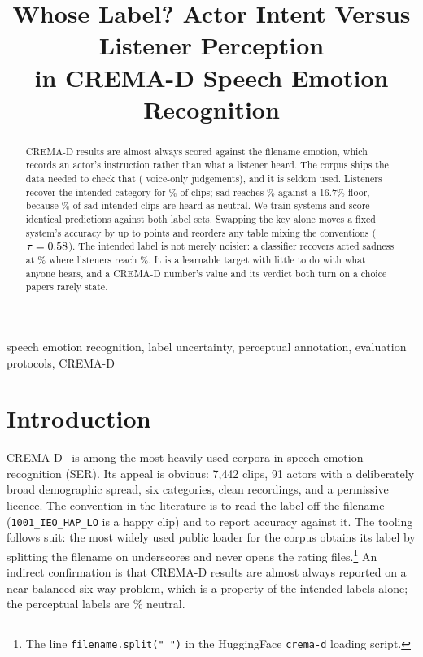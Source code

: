 \documentclass{article}
\title{Whose Label? Actor Intent Versus Listener Perception \\
  in CREMA-D Speech Emotion Recognition}
\begin{document}
\ninept
\maketitle

\begin{abstract}
CREMA-D results are almost always scored against the filename emotion, which
records an actor's instruction rather than what a listener heard. The corpus
ships the data needed to check that (\NRatings{} voice-only judgements), and it
is seldom used. Listeners recover the intended category for \Recovery\% of
clips; sad reaches \SadRecovery\% against a 16.7\% floor, because
\SadToNeutral\% of sad-intended clips are heard as neutral. We train
\NSystemsWord{} systems and score identical predictions against both label sets.
Swapping the key alone moves a fixed system's accuracy by up to \SwingWAmax{}
points and reorders any table mixing the conventions ($\tau = 0.58$). The
intended label is not merely noisier: a classifier recovers acted sadness at
\ModelSad\% where listeners reach \HumanSad\%. It is a learnable target with
little to do with what anyone hears, and a CREMA-D number's value and its
verdict both turn on a choice papers rarely state.
\end{abstract}

\begin{keywords}
speech emotion recognition, label uncertainty, perceptual annotation,
evaluation protocols, CREMA-D
\end{keywords}

\section{Introduction}
\label{sec:intro}

CREMA-D~\cite{cao2014cremad} is among the most heavily used corpora in speech
emotion recognition (SER). Its appeal is obvious: 7{,}442 clips, 91 actors with
a deliberately broad demographic spread, six categories, clean recordings, and a
permissive licence. The convention in the literature is to read the label off
the filename (\texttt{1001\_IEO\_HAP\_LO} is a happy clip) and to report
accuracy against it. The tooling follows suit: the most widely used public
loader for the corpus obtains its label by splitting the filename on underscores
and never opens the rating files.\footnote{The line
\texttt{filename.split("\_")} in the HuggingFace \texttt{crema-d} loading
script.} An indirect confirmation is that CREMA-D results are almost always
reported on a near-balanced six-way problem, which is a property of the intended
labels alone; the perceptual labels are \NeutralShare\% neutral.
\end{document}
